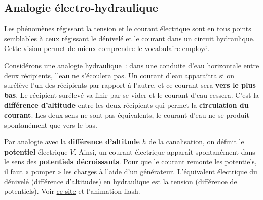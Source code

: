 \documentclass[../../main/main.tex]{subfiles}
\begin{document}
\subsection{Analogie électro-hydraulique}

Les phénomènes régissant la tension et le courant électrique sont en tous points
semblables à ceux régissant le dénivelé et le courant dans un circuit
hydraulique. Cette vision permet de mieux comprendre le vocabulaire employé.

Considérons une analogie hydraulique~: dans une conduite d'eau horizontale entre
deux récipients, l'eau ne s'écoulera pas. Un courant d'eau apparaîtra si on
surélève l'un des récipients par rapport à l'autre, et ce courant sera
\textbf{vers le plus bas}. Le récipient surélevé va finir par se vider et le
courant d'eau cessera. C'est la \textbf{différence d'altitude} entre les deux
récipients qui permet la \textbf{circulation du courant}. Les deux sens ne sont
pas équivalents, le courant d'eau ne se produit spontanément que vers le bas.

Par analogie avec la \textbf{différence d'altitude} $h$ de la canalisation, on
définit le \textbf{potentiel} électrique $V$. Ainsi, un courant électrique
apparaît spontanément dans le sens des \textbf{potentiels décroissants}. Pour
que le courant remonte les potentiels, il faut « pomper » les charges à l'aide
d'un générateur. L'équivalent électrique du dénivelé (différence d'altitudes) en
hydraulique est la tension (différence de potentiels). Voir
\href{https://www.pccl.fr/physique\_chimie\_college\_lycee/quatrieme/electricite/analogie\_hydraulique.htm}
{ce site} et l'animation flash.

\end{document}
